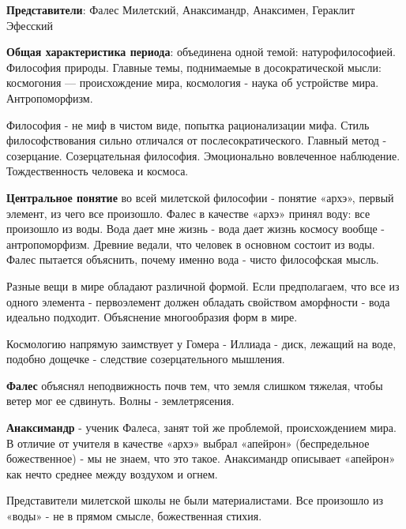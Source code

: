 \documentclass{article}
\begin{document}
\begin{flushleft}

\textbf{Представители}: Фалес Милетский, Анаксимандр, Анаксимен, Гераклит Эфесский\par

\textbf{Общая характеристика периода}: объединена одной темой: натурофилософией. Философия природы. Главные темы, поднимаемые в досократической мысли: космогония — происхождение мира, космология - наука об устройстве мира. Антропоморфизм.

\hfill

Философия - не миф в чистом виде, попытка рационализации мифа. Стиль философствования сильно отличался от послесократического. Главный метод - созерцание. Созерцательная философия. Эмоционально вовлеченное наблюдение. Тождественность человека и космоса.

\hfill

\textbf{Центральное понятие} во всей милетской философии - понятие «архэ», первый элемент, из чего все произошло. Фалес в качестве «архэ» принял воду: все произошло из воды. Вода дает мне жизнь - вода дает жизнь космосу вообще - антропоморфизм. Древние ведали, что человек в основном состоит из воды. Фалес пытается объяснить, почему именно вода - чисто философская мысль.

\hfill

Разные вещи в мире обладают различной формой. Если предполагаем, что все из одного элемента - первоэлемент должен обладать свойством аморфности - вода идеально подходит. Объяснение многообразия форм в мире.

\hfill

Космологию напрямую заимствует у Гомера - Иллиада - диск, лежащий на воде, подобно дощечке - следствие созерцательного мышления.

\hfill

\textbf{Фалес} объяснял неподвижность почв тем, что земля слишком тяжелая, чтобы ветер мог ее сдвинуть. Волны - землетрясения.

\hfill

\textbf{Анаксимандр} - ученик Фалеса, занят той же проблемой, происхождением мира. В отличие от учителя в качестве «архэ» выбрал «апейрон» (беспредельное божественное) - мы не знаем, что это такое. Анаксимандр описывает «апейрон» как нечто среднее между воздухом и огнем.

\hfill

Представители милетской школы не были материалистами. Все произошло из «воды» - не в прямом смысле, божественная стихия.


\end{flushleft}
\end{document}
